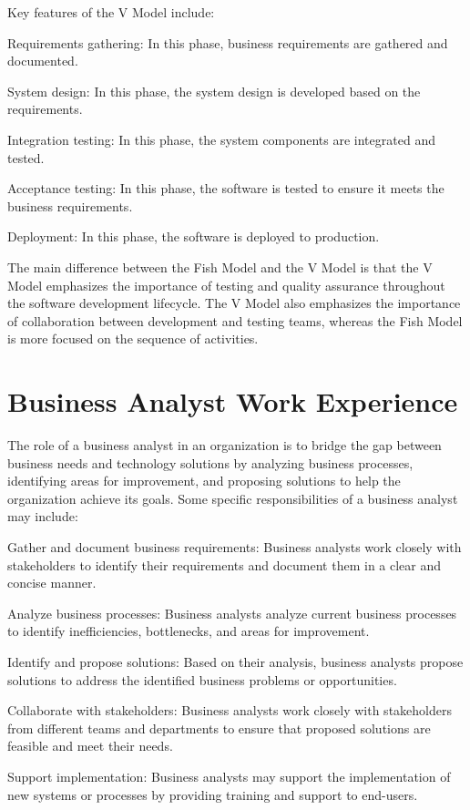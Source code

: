 \documentclass[12pt, a4paper, oneside]{article}
\begin{document}
Key features of the V Model include:

Requirements gathering: In this phase, business requirements are gathered and documented.

System design: In this phase, the system design is developed based on the requirements.

Integration testing: In this phase, the system components are integrated and tested.

Acceptance testing: In this phase, the software is tested to ensure it meets the business requirements.

Deployment: In this phase, the software is deployed to production.

The main difference between the Fish Model and the V Model is that the V Model emphasizes the importance of testing and quality assurance throughout the software development lifecycle. The V Model also emphasizes the importance of collaboration between development and testing teams, whereas the Fish Model is more focused on the sequence of activities.

\section{Business Analyst Work Experience }
The role of a business analyst in an organization is to bridge the gap between business needs and technology solutions by analyzing business processes, identifying areas for improvement, and proposing solutions to help the organization achieve its goals. Some specific responsibilities of a business analyst may include:

Gather and document business requirements: Business analysts work closely with stakeholders to identify their requirements and document them in a clear and concise manner.

Analyze business processes: Business analysts analyze current business processes to identify inefficiencies, bottlenecks, and areas for improvement.

Identify and propose solutions: Based on their analysis, business analysts propose solutions to address the identified business problems or opportunities.

Collaborate with stakeholders: Business analysts work closely with stakeholders from different teams and departments to ensure that proposed solutions are feasible and meet their needs.

Support implementation: Business analysts may support the implementation of new systems or processes by providing training and support to end-users.
\end{document}
